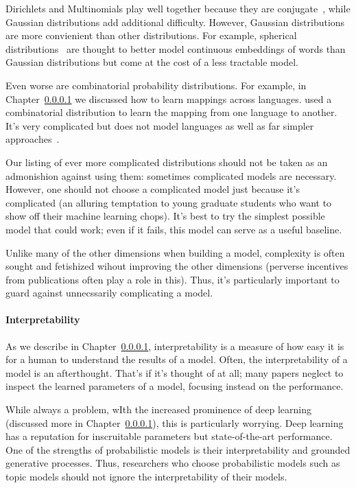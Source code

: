 Dirichlets and Multinomials play well together because they are
conjugate~\citep{}, while Gaussian distributions add additional
difficulty.  However, Gaussian distributions are more convienient than
other distributions.  For example, spherical distributions~\citep{} are thought
to better model continuous embeddings of words than Gaussian
distributions but come at the cost of a less tractable model.

Even worse are combinatorial probability distributions.  For example,
in Chapter~\ref{} we discussed how to learn mappings across
languages.  \citet{} used a combinatorial distribution to learn the
mapping from one language to another.  It's very complicated but
does not model languages as well as far simpler approaches~\citep{}.

Our listing of ever more complicated distributions should not be taken
as an admonishion against using them: sometimes complicated models are
necessary.  However, one should not choose a complicated model just
because it's complicated (an alluring temptation to young graduate
students who want to show off their machine learning chops).  It's
best to try the simplest possible model that could work; even if it
fails, this model can serve as a useful baseline.

Unlike many of the other dimensions when building a model, complexity
is often sought and fetishized wihout improving the other dimensions
(perverse incentives from publications often play a role in this).
Thus, it's particularly important to guard against unnecssarily
complicating a model.

\paragraph{Interpretability}

As we describe in Chapter~\ref{}, interpretability is a measure of how
easy it is for a human to understand the results of a model.  Often,
the interpretability of a model is an afterthought.  That's if it's thought of
at all; many papers neglect to inspect the learned parameters of a
model, focusing instead on the performance.

While always a problem, wIth the increased prominence of deep learning (discussed more in
Chapter~\ref{}), this is particularly worrying.  Deep learning has a
reputation for inscruitable parameters but state-of-the-art
performance.  One of the strengths of probabilistic models is their
interpretability and grounded generative processes.  Thus, researchers who
choose probabilistic models such as topic models should not ignore the
interpretability of their models.

